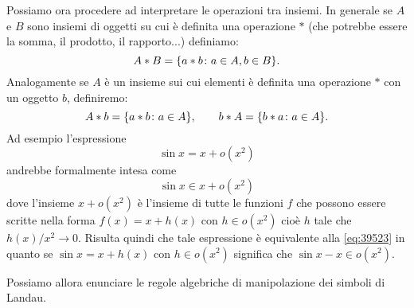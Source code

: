 Possiamo ora procedere ad interpretare le operazioni tra insiemi. In generale se $A$ e $B$ sono insiemi di oggetti su cui è definita una operazione $*$ (che potrebbe essere la somma, il prodotto, il rapporto...) definiamo:
\[
  A * B = {\left\{ a*b \colon a \in A, b\in B \right\}}.
\]
Analogamente se $A$ è un insieme sui cui elementi è definita una operazione $*$ con un oggetto $b$, definiremo:
\[
  A * b = {\left\{ a*b\colon a \in A \right\}}, \qquad
  b * A = {\left\{ b*a\colon a \in A \right\}}.
\]
Ad esempio l'espressione
\[
  \sin x = x + o(x^2)
\]
andrebbe formalmente intesa come
\[
  \sin x  \in x + o(x^2)
\]
dove l'insieme $x+ o(x^2)$ è l'insieme di tutte le funzioni
$f$ che possono essere scritte nella forma $f(x) = x+h(x)$ con $h\in o(x^2)$ cioè $h$ tale che $h(x)/x^2 \to 0$. Risulta quindi che tale espressione è equivalente alla \eqref{eq:39523} in quanto se $\sin x = x + h(x)$ con $h\in o(x^2)$ significa che $\sin x- x \in o(x^2)$.

Possiamo allora enunciare le regole algebriche di manipolazione dei simboli di Landau.

